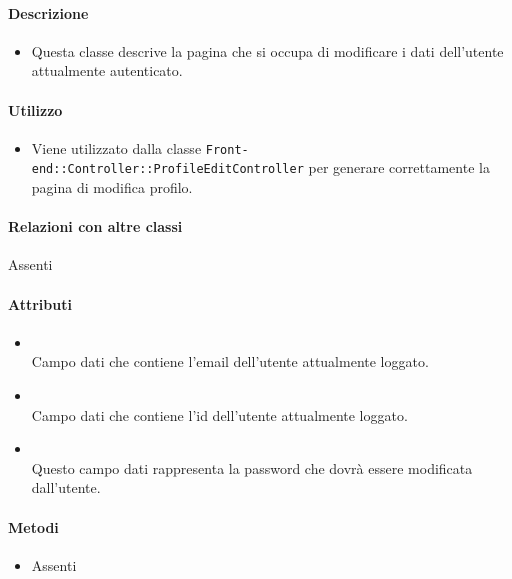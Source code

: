 \paragraph*{Descrizione}
\begin{itemize}
\item[] Questa classe descrive la pagina che si occupa di modificare i dati dell'utente attualmente autenticato.
\end{itemize}

\paragraph*{Utilizzo}
\begin{itemize}
\item[] Viene utilizzato dalla classe \texttt{Front-end::Controller::ProfileEditController} per generare correttamente la pagina di modifica profilo.
\end{itemize}

\paragraph*{Relazioni con altre classi}
Assenti

\paragraph*{Attributi}
\begin{itemize}
\item[]  \\ Campo dati che contiene l'email dell'utente attualmente loggato.
\item[]  \\ Campo dati che contiene l'id dell'utente attualmente loggato.
\item[]  \\ Questo campo dati rappresenta la password che dovrà essere modificata dall'utente.
\end{itemize}

\paragraph*{Metodi}
\begin{itemize}
\item[] Assenti
\end{itemize}
